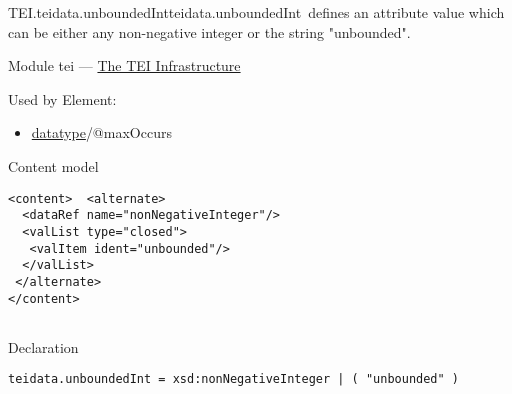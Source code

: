 \begin{reflist}
\item[]\begin{specHead}{TEI.teidata.unboundedInt}{teidata.unboundedInt} defines an attribute value which can be either any non-negative integer or the string "unbounded".\end{specHead} 
    \item[{Module}]
  tei — \hyperref[ST]{The TEI Infrastructure}
    \item[{Used by}]
  Element: \begin{itemize}
\item \hyperref[TEI.datatype]{datatype}/@maxOccurs
\end{itemize} 
    \item[{Content model}]
  \mbox{}\hfill\\[-10pt]\begin{Verbatim}[fontsize=\small]
<content>  <alternate>
  <dataRef name="nonNegativeInteger"/>
  <valList type="closed">
   <valItem ident="unbounded"/>
  </valList>
 </alternate>
</content>
    
\end{Verbatim}

    \item[{Declaration}]
  \mbox{}\hfill\\[-10pt]\begin{Verbatim}[fontsize=\small]
teidata.unboundedInt = xsd:nonNegativeInteger | ( "unbounded" )
\end{Verbatim}

\end{reflist}  
